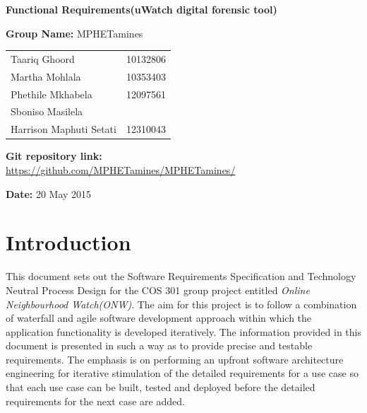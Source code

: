\documentclass[a4paper,12pt]{article}
\begin{document}
\begin{center}

\Huge\textbf{Functional Requirements(uWatch digital forensic tool)\\}
																											
\vspace{2 cm}

\LARGE\textbf{Group Name:} MPHETamines\newline
 
 
 
 
 
\vspace{0.5 cm}
\begin{tabular}{lr}
Taariq Ghoord&10132806
\\ 
Martha Mohlala&10353403
\\
Phethile Mkhabela&12097561
\\
Sboniso Masilela&%
\\
Harrison Maphuti Setati&12310043\\
\end{tabular}

\vspace{1cm}
\textbf{Git repository link:\\}
\url{https://github.com/MPHETamines/MPHETamines/}

\vspace{1cm}
\textbf{Date:} 20 May 2015
\end{center}
\newpage

\tableofcontents







\newpage
{}

\section{Introduction}
This document sets out the Software Requirements Specification and Technology Neutral Process Design for the COS 301 group project entitled \textit{Online Neighbourhood Watch(ONW)}.
The aim for this project is to follow a combination of waterfall and agile software development approach within which the application functionality is developed 
iteratively. 
The information provided in this document is presented in such a way as to provide precise and testable requirements. The emphasis is on performing an upfront software 
architecture engineering for iterative stimulation of the detailed requirements for a use case so that each use case can be built, tested and deployed before the detailed 
requirements for the next case are added.
\end{document}
